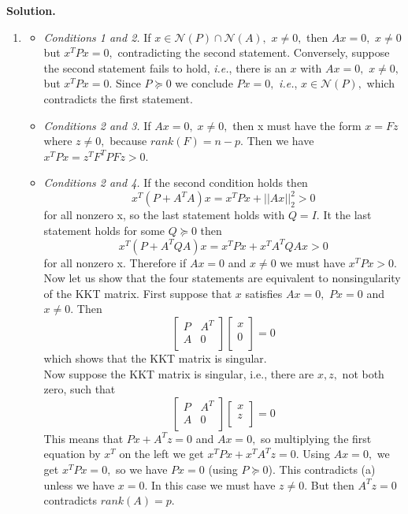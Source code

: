\documentclass{article}
\begin{document}
\textbf{Solution.} \\

\begin{enumerate}[label=\alph*)]
\item 
\begin{itemize}
    \item \textit{Conditions 1 and 2.}
    If $x \in \mathcal{N}(P) \cap \mathcal{N}(A),$ 
    $x \ne 0,$ then $Ax = 0,$ $x \ne 0$ but $x^T P x = 0,$
    contradicting the second statement. Conversely, suppose the second statement fails to hold, 
    \textit{i.e.}, there is an $x$ with $Ax = 0,$
    $x \ne 0,$ but $x^T P x = 0.$ Since $P \succeq 0$ 
    we conclude $Px = 0,$ \textit{i.e.},
    $x \in \mathcal{N}(P),$ which
    contradicts the first statement.
    	
	\item \textit{Conditions 2 and 3.}
	If $Ax = 0, \; x \ne 0,$ 
	then x must have the form
	$x = Fz$ where $z \ne 0,$
	because $rank(F) = n - p.$ Then we have
	$x^T P x = z^T F^T P F z > 0.$
	
	\item \textit{Conditions 2 and 4.} 
	If the second condition holds then 
	$$
	x^T(P + A^TA)x = x^TPx + ||Ax||_2^2 > 0
	$$
	for all nonzero x, so the last statement holds with
	$Q = I.$ It the last statement holds for some 
	$Q \succeq 0$ then
	$$
	x^T(P + A^TQA)x = x^TPx + x^T A^T Q A x > 0	
	$$
	for all nonzero x. Therefore if 
	$Ax = 0$ and $x \ne 0$ we must have $x^TPx > 0.$ \\
	Now let us show that the four statements are equivalent to nonsingularity of the
	KKT matrix. First suppose that $x$ satisfies 
	$Ax = 0,$ $Px = 0$ and $x \ne 0.$ Then 
	$$
	\begin{bmatrix} 
		P & A^T \\
		A & 0\\
	\end{bmatrix}
	\begin{bmatrix} 
	x\\
	0\\
	\end{bmatrix} = 0
	$$
which shows that the KKT matrix is singular.\\
Now suppose the KKT matrix is singular, i.e., there are $x, z,$ not both zero, such that	
	$$
\begin{bmatrix} 
	P & A^T \\
	A & 0\\
\end{bmatrix}
\begin{bmatrix} 
	x\\
	z\\
\end{bmatrix} = 0
$$
This means that $Px + A^Tz = 0$ and $Ax = 0,$ so multiplying the first equation by $x^T$ on the left 
we get $x^TPx + x^TA^Tz = 0.$ Using $Ax = 0,$ we get 
$x^T P x = 0,$ so we have $Px = 0$ (using $P \succeq 0$).
This contradicts (a) unless we have $x = 0.$ In this case we must have $z \ne 0.$ But then $A^Tz = 0$ contradicts 
$rank(A) = p.$


\end{itemize}
\end{enumerate}
\end{document}
